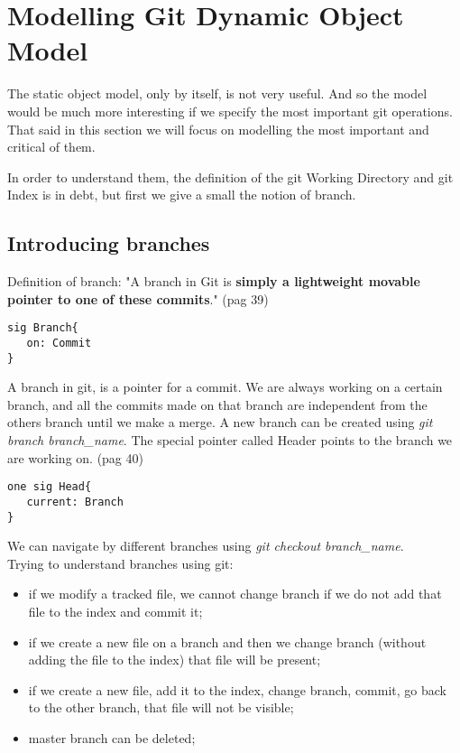 \section {Modelling Git Dynamic Object Model}
The static object model, only by itself, 
is not very useful. And so
the model would be much more interesting if we specify 
the most important git operations. That said in this
section we will focus on modelling the most important
and critical of them. \par

In order to understand them, the definition
of the git Working Directory and git Index is in debt,
but first we give a small the notion of branch.

\subsection{Introducing branches}
Definition of branch: "A branch in Git is {\bf simply a 
lightweight movable pointer to one of these commits}." \cite{progit} 
(pag 39)\\

\begin{lstlisting}
sig Branch{
   on: Commit
}
\end{lstlisting}

A branch in git, is a pointer for a commit. We are always 
working on a certain branch, and all the commits made on 
that branch are independent from the others branch until we 
make a merge. A new branch can be created using 
\emph{git branch branch\_name}. The special pointer called Header 
points to the branch we are working on. \cite{progit} (pag 40)

\begin{lstlisting}
one sig Head{
   current: Branch
}
\end{lstlisting}

We can navigate by different branches using 
\emph{git checkout branch\_name}.\\



Trying to understand branches using git:
\begin{itemize}
   \item if we modify a tracked file, we cannot change branch if we do not add that file to the index and commit it;
   \item if we create a new file on a branch and then we change branch (without adding the file to the index) that file will be present;
   \item if we create a new file, add it to the index, change branch, commit, go back to the other branch, that file will not be visible;
   \item master branch can be deleted;
\end{itemize}

